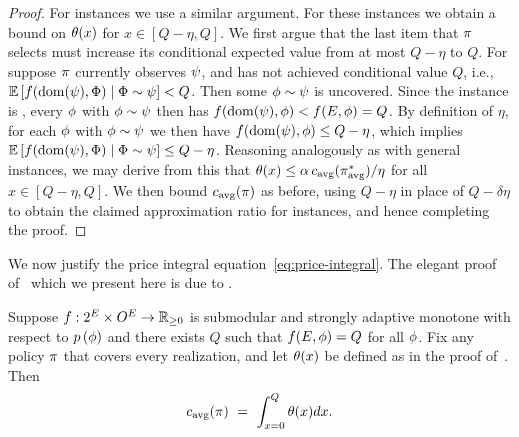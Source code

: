 \begin{proof}
%
For \certifying instances we use a similar argument.
For these instances we obtain a bound on $\price(x)$ for $x \in [Q-\eta, Q]$.
We first argue that 
the last item that $\policy$ selects must increase its conditional expected
value from at most $Q - \eta$ to $Q$.
For suppose $\policy$ currently observes $\prlz$, and has not achieved
conditional value $Q$, i.e., $\progress{\prlz} < Q$.
Then some $\rlz \sim \prlz$ is uncovered.
Since the instance is \certifying, every $\rlz$ with
$\rlz \sim \prlz$ then has $f(\dom(\prlz), \rlz) < f(\groundset, \rlz)  =
Q$.  By definition of $\eta$, for each $\rlz$ with
$\rlz \sim \prlz$ we then have $f(\dom(\prlz), \rlz) \le Q - \eta$, which
implies $\progress{\prlz} \le Q - \eta$.
%
Reasoning analogously as with general instances, we may derive from
this that $\price(x) \le \alpha \, \acst{\policycover} / \eta$ for all $x \in [Q - \eta,
Q]$.  We then bound 
$\acst{\policy}$ as before, using $Q - \eta$ in place of $Q -
\delta\eta$ to obtain the claimed
approximation ratio for \certifying instances, and hence completing the
proof.
\end{proof}

\noindent
We now justify the price integral equation~\eqref{eq:price-integral}.
The elegant proof of~ which we
present here is due to \citet{feldman12lemma}.
 
\begin{lemma} \label{lem:price-integral}
Suppose $f:2^{\groundset} \times \outcomes^{\groundset} \to
\NonNegativeReals$ is \term submodular and strongly adaptive
monotone with respect to $\rlzprior$ and there exists $Q$ such that 
$f(\groundset, \rlz) = Q$ for all $\rlz$.
Fix any policy $\policy$ that covers every realization, and let
$\price(x)$ be defined as in the proof
of~.
Then 
\[
\acst{\policy} \ = \ \int_{x=0}^{Q} \price(x) dx\mbox{.}
\]
\end{lemma}

